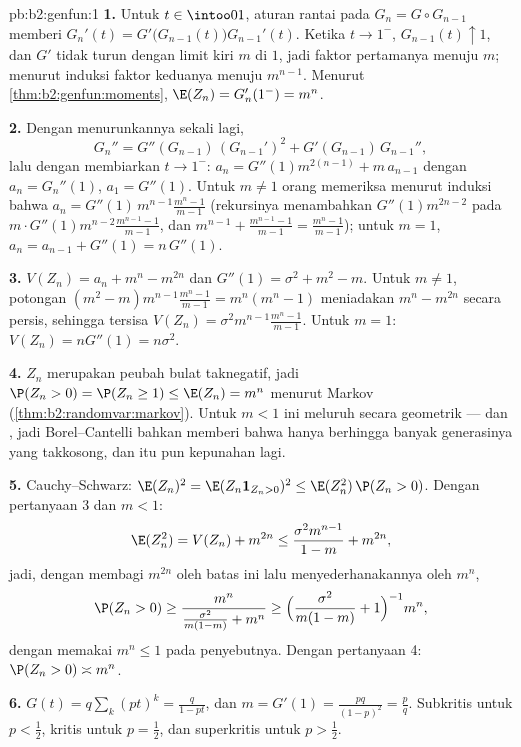 \begin{solution}{pb:b2:genfun:1}
\textbf{1.} Untuk $t \in \intoo01$, aturan rantai pada $G_n = G
\circ G_{n-1}$ memberi $G_n'(t) =
G'\bigl(G_{n-1}(t)\bigr)G_{n-1}'(t)$. Ketika $t \to 1^-$,
$G_{n-1}(t) \uparrow 1$, dan $G'$ tidak turun dengan
limit kiri $m$ di $1$, jadi faktor pertamanya menuju $m$; menurut
induksi faktor keduanya menuju $m^{n-1}$. Menurut
\cref{thm:b2:genfun:moments}, $\E(Z_n) = G_n'(1^-) = m^n$.

\textbf{2.} Dengan menurunkannya sekali lagi,
\[
G_n'' = G''(G_{n-1})\,(G_{n-1}')^2 +
G'(G_{n-1})\,G_{n-1}'',
\]
lalu dengan membiarkan $t \to 1^-$: $a_n = G''(1)m^{2(n-1)} + m\,
a_{n-1}$ dengan $a_n = G_n''(1)$, $a_1 = G''(1)$. Untuk $m \neq
1$ orang memeriksa menurut induksi bahwa $a_n = G''(1)\,m^{n-1}
\frac{m^n - 1}{m - 1}$ (rekursinya menambahkan $G''(1)m^{2n-2}$
pada $m\cdot G''(1)m^{n-2}\frac{m^{n-1}-1}{m-1}$, dan
$m^{n-1} + \frac{m^{n-1}-1}{m-1} = \frac{m^n - 1}{m-1}$);
untuk $m = 1$, $a_n = a_{n-1} + G''(1) = n\,G''(1)$.

\textbf{3.} $V(Z_n) = a_n + m^n - m^{2n}$ dan $G''(1) =
\sigma^2 + m^2 - m$. Untuk $m \neq 1$, potongan $(m^2 -
m)m^{n-1}\frac{m^n-1}{m-1} = m^n(m^n - 1)$ meniadakan $m^n -
m^{2n}$ secara persis, sehingga tersisa $V(Z_n) =
\sigma^2m^{n-1}\frac{m^n-1}{m-1}$. Untuk $m = 1$: $V(Z_n) =
nG''(1) = n\sigma^2$.

\textbf{4.} $Z_n$ merupakan peubah bulat taknegatif, jadi
$\P(Z_n > 0) = \P(Z_n \geq 1) \leq \E(Z_n) = m^n$ menurut Markov
(\cref{thm:b2:randomvar:markov}). Untuk $m < 1$ ini meluruh
secara geometrik --- dan , jadi Borel--Cantelli bahkan memberi
bahwa hanya berhingga banyak generasinya yang takkosong, dan itu pun
kepunahan lagi.

\textbf{5.} Cauchy--Schwarz: $\E(Z_n)^2 = \E(Z_n\mathbf
1_{Z_n>0})^2 \leq \E(Z_n^2)\,\P(Z_n > 0)$. Dengan pertanyaan 3
dan $m < 1$:
\[
\E(Z_n^2) = V(Z_n) + m^{2n}
\leq \frac{\sigma^2m^{n-1}}{1-m} + m^{2n},
\]
jadi, dengan membagi $m^{2n}$ oleh batas ini lalu menyederhanakannya oleh
$m^n$,
\[
\P(Z_n > 0) \geq \frac{m^n}{\frac{\sigma^2}{m(1-m)} + m^n}
\geq \Bigl(\frac{\sigma^2}{m(1-m)} + 1\Bigr)^{-1}m^n ,
\]
dengan memakai $m^n \leq 1$ pada penyebutnya. Dengan pertanyaan 4:
$\P(Z_n > 0) \asymp m^n$.

\textbf{6.} $G(t) = q\sum_k(pt)^k = \frac{q}{1 - pt}$, dan $m
= G'(1) = \frac{pq}{(1-p)^2} = \frac pq$. Subkritis untuk $p
< \frac12$, kritis untuk $p = \frac12$, dan superkritis untuk $p
> \frac12$.


\end{solution}
